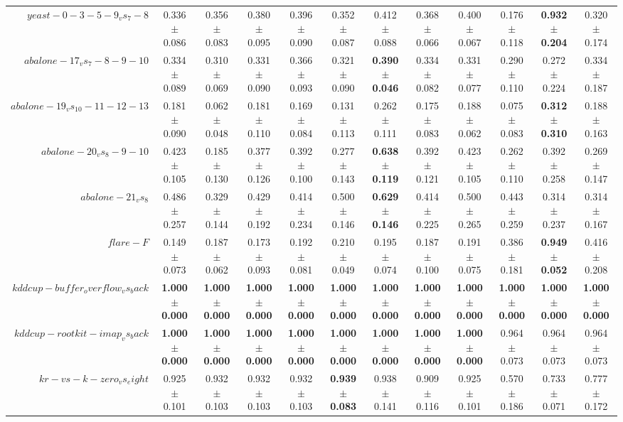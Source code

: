 \begin{table}[!ht]
{\begin{tabular}{r c c c c c c c c c c c}
$yeast-0-3-5-9_vs_7-8$ & 0.336 $\pm$ 0.086 & 0.356 $\pm$ 0.083 & 0.380 $\pm$ 0.095 & 0.396 $\pm$ 0.090 & 0.352 $\pm$ 0.087 & 0.412 $\pm$ 0.088 & 0.368 $\pm$ 0.066 & 0.400 $\pm$ 0.067 & 0.176 $\pm$ 0.118 & \textbf{0.932 $\pm$ 0.204} & 0.320 $\pm$ 0.174 \\
$abalone-17_vs_7-8-9-10$ & 0.334 $\pm$ 0.089 & 0.310 $\pm$ 0.069 & 0.331 $\pm$ 0.090 & 0.366 $\pm$ 0.093 & 0.321 $\pm$ 0.090 & \textbf{0.390 $\pm$ 0.046} & 0.334 $\pm$ 0.082 & 0.331 $\pm$ 0.077 & 0.290 $\pm$ 0.110 & 0.272 $\pm$ 0.224 & 0.334 $\pm$ 0.187 \\
$abalone-19_vs_10-11-12-13$ & 0.181 $\pm$ 0.090 & 0.062 $\pm$ 0.048 & 0.181 $\pm$ 0.110 & 0.169 $\pm$ 0.084 & 0.131 $\pm$ 0.113 & 0.262 $\pm$ 0.111 & 0.175 $\pm$ 0.083 & 0.188 $\pm$ 0.062 & 0.075 $\pm$ 0.083 & \textbf{0.312 $\pm$ 0.310} & 0.188 $\pm$ 0.163 \\
$abalone-20_vs_8-9-10$ & 0.423 $\pm$ 0.105 & 0.185 $\pm$ 0.130 & 0.377 $\pm$ 0.126 & 0.392 $\pm$ 0.100 & 0.277 $\pm$ 0.143 & \textbf{0.638 $\pm$ 0.119} & 0.392 $\pm$ 0.121 & 0.423 $\pm$ 0.105 & 0.262 $\pm$ 0.110 & 0.392 $\pm$ 0.258 & 0.269 $\pm$ 0.147 \\
$abalone-21_vs_8$ & 0.486 $\pm$ 0.257 & 0.329 $\pm$ 0.144 & 0.429 $\pm$ 0.192 & 0.414 $\pm$ 0.234 & 0.500 $\pm$ 0.146 & \textbf{0.629 $\pm$ 0.146} & 0.414 $\pm$ 0.225 & 0.500 $\pm$ 0.265 & 0.443 $\pm$ 0.259 & 0.314 $\pm$ 0.237 & 0.314 $\pm$ 0.167 \\
$flare-F$ & 0.149 $\pm$ 0.073 & 0.187 $\pm$ 0.062 & 0.173 $\pm$ 0.093 & 0.192 $\pm$ 0.081 & 0.210 $\pm$ 0.049 & 0.195 $\pm$ 0.074 & 0.187 $\pm$ 0.100 & 0.191 $\pm$ 0.075 & 0.386 $\pm$ 0.181 & \textbf{0.949 $\pm$ 0.052} & 0.416 $\pm$ 0.208 \\
$kddcup-buffer_overflow_vs_back$ & \textbf{1.000 $\pm$ 0.000} & \textbf{1.000 $\pm$ 0.000} & \textbf{1.000 $\pm$ 0.000} & \textbf{1.000 $\pm$ 0.000} & \textbf{1.000 $\pm$ 0.000} & \textbf{1.000 $\pm$ 0.000} & \textbf{1.000 $\pm$ 0.000} & \textbf{1.000 $\pm$ 0.000} & \textbf{1.000 $\pm$ 0.000} & \textbf{1.000 $\pm$ 0.000} & \textbf{1.000 $\pm$ 0.000} \\
$kddcup-rootkit-imap_vs_back$ & \textbf{1.000 $\pm$ 0.000} & \textbf{1.000 $\pm$ 0.000} & \textbf{1.000 $\pm$ 0.000} & \textbf{1.000 $\pm$ 0.000} & \textbf{1.000 $\pm$ 0.000} & \textbf{1.000 $\pm$ 0.000} & \textbf{1.000 $\pm$ 0.000} & \textbf{1.000 $\pm$ 0.000} & 0.964 $\pm$ 0.073 & 0.964 $\pm$ 0.073 & 0.964 $\pm$ 0.073 \\
$kr-vs-k-zero_vs_eight$ & 0.925 $\pm$ 0.101 & 0.932 $\pm$ 0.103 & 0.932 $\pm$ 0.103 & 0.932 $\pm$ 0.103 & \textbf{0.939 $\pm$ 0.083} & 0.938 $\pm$ 0.141 & 0.909 $\pm$ 0.116 & 0.925 $\pm$ 0.101 & 0.570 $\pm$ 0.186 & 0.733 $\pm$ 0.071 & 0.777 $\pm$ 0.172 \\

\end{tabular}}
\end{table}
